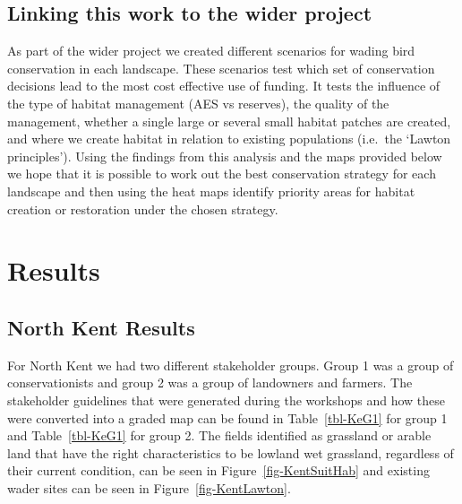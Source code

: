 \documentclass[
  12pt,
  letterpaper,
  DIV=11,
  numbers=noendperiod]{scrartcl}
\begin{document}
\subsection{Linking this work to the wider
project}\label{linking-this-work-to-the-wider-project}

As part of the wider project we created different scenarios for wading
bird conservation in each landscape. These scenarios test which set of
conservation decisions lead to the most cost effective use of funding.
It tests the influence of the type of habitat management (AES vs
reserves), the quality of the management, whether a single large or
several small habitat patches are created, and where we create habitat
in relation to existing populations (i.e.~the `Lawton principles').
Using the findings from this analysis and the maps provided below we
hope that it is possible to work out the best conservation strategy for
each landscape and then using the heat maps identify priority areas for
habitat creation or restoration under the chosen strategy.

\section{Results}\label{results}

\subsection{North Kent Results}\label{north-kent-results}

For North Kent we had two different stakeholder groups. Group 1 was a
group of conservationists and group 2 was a group of landowners and
farmers. The stakeholder guidelines that were generated during the
workshops and how these were converted into a graded map can be found in
Table~\ref{tbl-KeG1} for group 1 and Table~\ref{tbl-KeG1} for group 2.
The fields identified as grassland or arable land that have the right
characteristics to be lowland wet grassland, regardless of their current
condition, can be seen in Figure~\ref{fig-KentSuitHab} and existing
wader sites can be seen in Figure~\ref{fig-KentLawton}.
\end{document}
